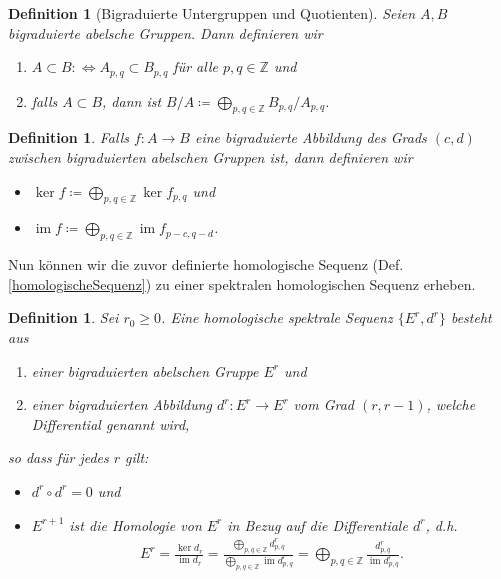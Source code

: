\documentclass[12pt, hidelinks]{article}
\numberwithin{conj}{section}
\newtheorem{definition}[conj]{Definition}
\newcommand{\Z}{\mathbb{Z}}
\newcommand{\ima}{\operatorname{im}}
\begin{document}
\begin{definition}[Bigraduierte Untergruppen und Quotienten]
    Seien $A,B$ bigraduierte abelsche Gruppen. Dann definieren wir
    \begin{enumerate}[nolistsep]
        \item $A \subset B \colon\Leftrightarrow A_{p,q} \subset B_{p,q}$ für alle $p,q \in \Z$ und
        \item falls $A \subset B$, dann ist $B/A \coloneq \bigoplus_{p,q \in \Z} B_{p,q}/A_{p,q}$.
    \end{enumerate}
\end{definition}

\begin{definition}
    Falls $f: A \to B$ eine bigraduierte Abbildung des Grads $(c,d)$ zwischen bigraduierten abelschen Gruppen ist, dann definieren wir
    \begin{itemize}[nolistsep]
        \item $\ker f \coloneq \bigoplus_{p,q \in \Z} \ker f_{p,q}$ und
        \item $\ima f \coloneq \bigoplus_{p,q \in \Z} \ima f_{p-c,q-d}$.
    \end{itemize}
\end{definition}

Nun können wir die zuvor definierte homologische Sequenz (Def. \ref{homologischeSequenz}) zu einer spektralen homologischen Sequenz erheben.

\begin{definition}
    \label{homologischeSpektraleSequenz}
    Sei $r_0 \geq 0$. Eine homologische spektrale Sequenz $\{E^r,d^r\}$ besteht aus
    \begin{enumerate}[nolistsep]
        \item einer bigraduierten abelschen Gruppe $E^r$ und
        \item einer bigraduierten Abbildung $d^r: E^r \to E^r$ vom Grad $(r,r-1)$, welche Differential genannt wird,
    \end{enumerate}
    so dass für jedes $r$ gilt:
    \begin{itemize}[nolistsep]
        \item $d^r \circ d^r = 0$ und
        \item $E^{r+1}$ ist die Homologie von $E^r$ in Bezug auf die Differentiale $d^r$, d.h.
        \begin{align}
            E^r = \frac{\ker d_r}{\ima d_r} = \frac{\bigoplus_{p,q \in \Z} d^r_{p,q}}{\bigoplus_{p,q \in \Z} \ima d^r_{p,q}} = \bigoplus_{p,q \in \Z} \frac{d^r_{p,q}}{\ima d^r_{p,q}}.
        \end{align}
    \end{itemize}
\end{definition}
\end{document}
